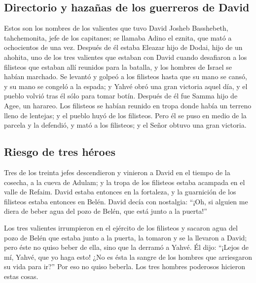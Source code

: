 \begin{paracol}{2}
{\subsection{Directorio y hazañas de los guerreros de
David}\label{directorio-y-hazauxf1as-de-los-guerreros-de-david}}

 Estos son los nombres de los valientes que tuvo David
Josheb Basshebeth, tahchemonita, jefe de los capitanes; se llamaba Adino
el eznita, que mató a ochocientos de una vez.  Después de
él estaba Eleazar hijo de Dodai, hijo de un ahohita, uno de los tres
valientes que estaban con David cuando desafiaron a los filisteos que
estaban allí reunidos para la batalla, y los hombres de Israel se habían
marchado.  Se levantó y golpeó a los filisteos hasta que
su mano se cansó, y su mano se congeló a la espada; y Yahvé obró una
gran victoria aquel día, y el pueblo volvió tras él sólo para tomar
botín.  Después de él fue Samma hijo de Agee, un harareo.
Los filisteos se habían reunido en tropa donde había un terreno lleno de
lentejas; y el pueblo huyó de los filisteos.  Pero él se
puso en medio de la parcela y la defendió, y mató a los filisteos; y el
Señor obtuvo una gran victoria.

\hypertarget{riesgo-de-tres-huxe9roes}{%
\subsection{Riesgo de tres héroes}\label{riesgo-de-tres-huxe9roes}}

 Tres de los treinta jefes descendieron y vinieron a
David en el tiempo de la cosecha, a la cueva de Adulam; y la tropa de
los filisteos estaba acampada en el valle de Refaim. 
David estaba entonces en la fortaleza, y la guarnición de los filisteos
estaba entonces en Belén.  David decía con nostalgia:
``¡Oh, si alguien me diera de beber agua del pozo de Belén, que está
junto a la puerta!''

 Los tres valientes irrumpieron en el ejército de los
filisteos y sacaron agua del pozo de Belén que estaba junto a la puerta,
la tomaron y se la llevaron a David; pero éste no quiso beber de ella,
sino que la derramó a Yahvé.  Él dijo: ``¡Lejos de mí,
Yahvé, que yo haga esto! ¿No es ésta la sangre de los hombres que
arriesgaron su vida para ir?'' Por eso no quiso beberla. Los tres
hombres poderosos hicieron estas cosas.


\end{paracol}
